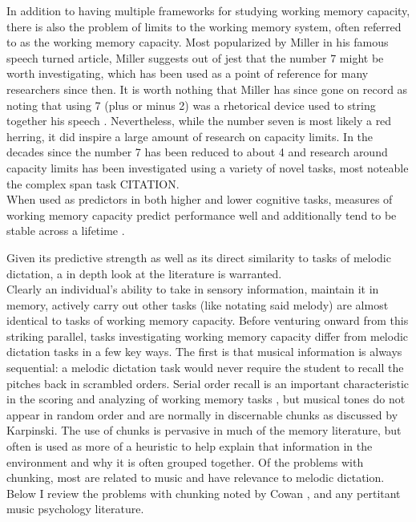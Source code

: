 \documentclass[]{book}
\theoremstyle{definition}
\theoremstyle{definition}
\theoremstyle{definition}
\theoremstyle{remark}
\begin{document}
In addition to having multiple frameworks for studying working memory
capacity, there is also the problem of limits to the working memory
system, often referred to as the working memory capacity. Most
popularized by Miller in his famous \citep{millerMagicalNumberSeven1956}
speech turned article, Miller suggests out of jest that the number 7
might be worth investigating, which has been used as a point of
reference for many researchers since then. It is worth nothing that
Miller has since gone on record as noting that using 7 (plus or minus 2)
was a rhetorical device used to string together his speech
\citep{millerHistoryPsychologyAutobiography1989}. Nevertheless, while
the number seven is most likely a red herring, it did inspire a large
amount of research on capacity limits. In the decades since the number 7
has been reduced to about 4 \citep{cowanMagicalMysteryFour2010} and
research around capacity limits has been investigated using a variety of
novel tasks, most noteable the complex span task CITATION.\\
When used as predictors in both higher and lower cognitive tasks,
measures of working memory capacity predict performance well and
additionally tend to be stable across a lifetime
\citep{unsworthAutomatedVersionOperation2005}.

Given its predictive strength as well as its direct similarity to tasks
of melodic dictation, a in depth look at the literature is warranted.\\
Clearly an individual's ability to take in sensory information, maintain
it in memory, actively carry out other tasks (like notating said melody)
are almost identical to tasks of working memory capacity. Before
venturing onward from this striking parallel, tasks investigating
working memory capacity differ from melodic dictation tasks in a few key
ways. The first is that musical information is always sequential: a
melodic dictation task would never require the student to recall the
pitches back in scrambled orders. Serial order recall is an important
characteristic in the scoring and analyzing of working memory tasks
\citep{conwayWorkingMemorySpan2005}, but musical tones do not appear in
random order and are normally in discernable chunks as discussed by
Karpinski\citep{karpinskiAuralSkillsAcquisition2000}. The use of chunks
is pervasive in much of the memory literature, but often is used as more
of a heuristic to help explain that information in the environment and
why it is often grouped together. Of the problems with chunking, most
are related to music and have relevance to melodic dictation. Below I
review the problems with chunking noted by Cowan
\citep{cowanWorkingMemoryCapacity2005}, and any pertitant music
psychology literature.
\end{document}
